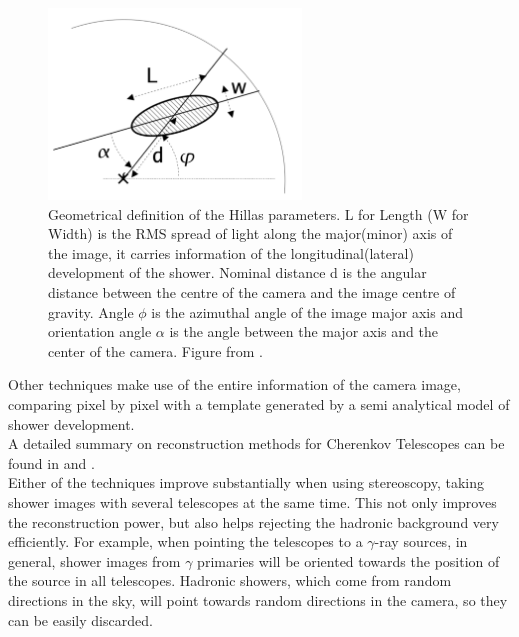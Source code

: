 \documentclass[main.tex]{subfiles}
\begin{document}
\begin{figure}
    \centering
    \includegraphics[width=0.6\textwidth]{Pictures/Hillaspars.pdf}
    \caption{Geometrical definition of the Hillas parameters. L for Length (W for Width) is the RMS spread of light along the major(minor) axis of the image, it carries information of the longitudinal(lateral) development of the shower. Nominal distance d is the angular distance between the centre of the camera and the image centre of gravity. Angle $\phi$ is the azimuthal angle of the image major axis and orientation angle $\alpha$ is the angle between the major axis and the center of the camera. Figure from \cite{2006analysismethodscherenkovtels}. }
    \label{fig:hillas}
\end{figure}

Other techniques make use of the entire information of the camera image, comparing pixel by pixel with a template generated by a semi analytical model of shower development.\\
A detailed summary on reconstruction methods for Cherenkov Telescopes can be found in \cite{2006analysismethodscherenkovtels} and \cite{2015groundbasedtechniques}.\\

Either of the techniques improve substantially when using stereoscopy, taking shower images with several telescopes at the same time. This not only improves the reconstruction power, but also helps rejecting the hadronic background very efficiently. For example, when pointing the telescopes to a $\gamma$-ray sources, in general, shower images from $\gamma$ primaries will be oriented towards the position of the source in all telescopes. Hadronic showers, which come from random directions in the sky, will point towards random directions in the camera, so they can be easily discarded. 
\end{document}
